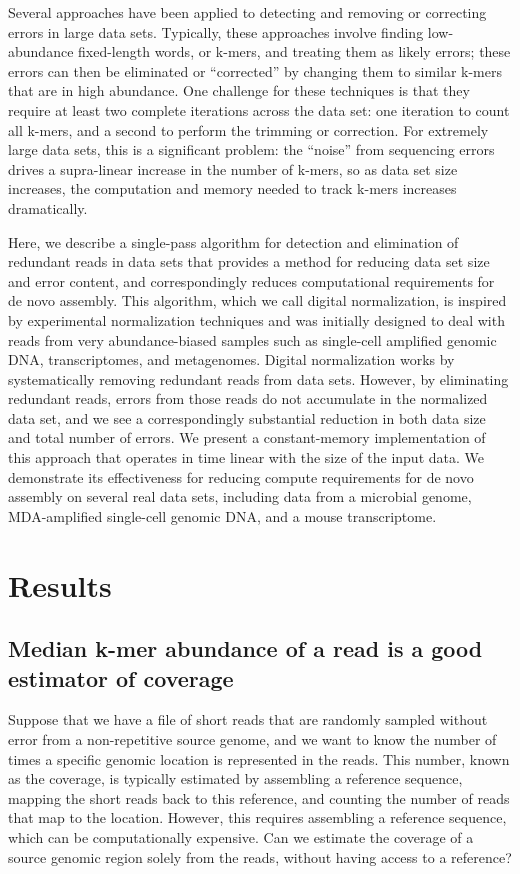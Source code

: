 \documentclass[10pt]{article}
\begin{document}
Several approaches have been applied to detecting and removing or
correcting errors in large data sets.  Typically, these approaches
involve finding low-abundance fixed-length words, or k-mers, and treating
them as likely errors; these errors can then be eliminated or
``corrected'' by changing them to similar k-mers that are in high
abundance.  One challenge for these techniques is that they
require at least two complete iterations across the data set: one
iteration to count all k-mers, and a second to perform the
trimming or correction.  For extremely large data sets, this
is a significant problem: the ``noise'' from
sequencing errors drives a supra-linear increase in the number of
k-mers, so as data set size increases, the computation and memory
needed to track k-mers increases dramatically.

Here, we describe a single-pass algorithm for detection and
elimination of redundant reads in data sets that provides a method for
reducing data set size and error content, and correspondingly reduces
computational requirements for de novo assembly.  This algorithm, which
we call digital normalization, is inspired by experimental
normalization techniques and was initially designed to deal with reads
from very abundance-biased samples such as single-cell amplified
genomic DNA, transcriptomes, and metagenomes.  Digital normalization
works by systematically removing redundant reads from data sets.
However, by eliminating redundant reads, errors from those reads do
not accumulate in the normalized data set, and we see a
correspondingly substantial reduction in both data size and total
number of errors.  We present a constant-memory implementation of this
approach that operates in time linear with the size of the input data.
We demonstrate its effectiveness for reducing compute requirements
for de novo assembly on several real data sets, including data from a
microbial genome, MDA-amplified single-cell genomic DNA, and a mouse
transcriptome.

\section*{Results}

\subsection*{Median k-mer abundance of a read is a good estimator of coverage}

Suppose that we have a file of short reads that are randomly sampled
without error from a non-repetitive source genome, and we want to know
the number of times a specific genomic location is represented in the
reads.  This number, known as the coverage, is typically estimated by
assembling a reference sequence, mapping the short reads back to this
reference, and counting the number of reads that map to the location.
However, this requires assembling a reference sequence, which can be
computationally expensive.  Can we estimate the coverage of a source
genomic region solely from the reads, without having access to a
reference?
\end{document}
